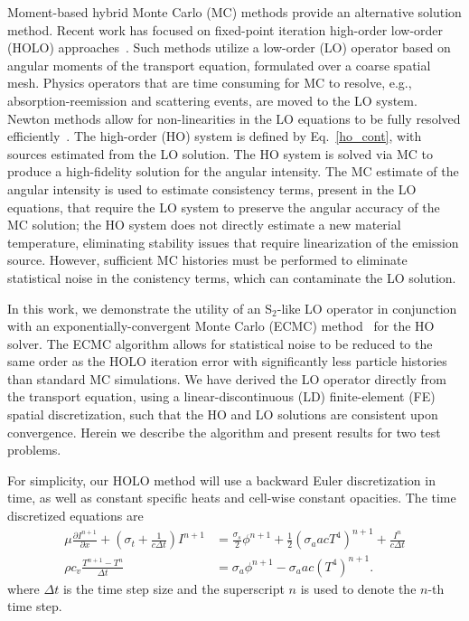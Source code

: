 \documentclass{mc2013}
\newcommand{\pderiv}[2]{\frac{\partial #1}{\partial #2}}
\begin{document}
Moment-based hybrid Monte Carlo (MC) methods provide an alternative solution
method.  Recent work has focused on fixed-point iteration high-order low-order (HOLO)
approaches~\cite{willert,park,rmc,ans_2014}.  Such methods utilize a low-order (LO)
operator based on angular moments of the transport equation, formulated over a coarse
spatial mesh. Physics operators that are time consuming for MC
to resolve, e.g., absorption-reemission and scattering events, are moved to the LO
system.  Newton methods allow for non-linearities in the LO equations to be fully
resolved efficiently~\cite{willert}.  The high-order (HO) system is defined by
Eq.~\eqref{ho_cont}, with sources estimated from the LO solution. The HO system is solved via MC to produce a high-fidelity solution for
the angular intensity.  The MC estimate of the angular intensity is used to estimate consistency terms,
present in the LO equations, that require the LO system to preserve the angular accuracy of the
MC solution; the HO system does not directly estimate a new material temperature,
eliminating stability issues that require linearization of the emission source.
However, sufficient MC histories must be performed to eliminate statistical
noise in the conistency terms, which can contaminate the LO solution.

In this work, we demonstrate the utility of an S$_2$-like LO operator in conjunction with an
exponentially-convergent Monte Carlo (ECMC) method~\cite{jake} for the HO solver.
The ECMC algorithm allows for statistical noise to be reduced to the same order as
the HOLO iteration error with significantly less particle histories than standard MC
simulations. We have derived the LO operator directly from the transport
equation, using a linear-discontinuous (LD) finite-element (FE) spatial
discretization, such that the HO and LO solutions are consistent upon convergence.
Herein we describe the algorithm and present results for two test problems.


For simplicity, our HOLO method will use a backward Euler discretization in time, as
well as constant specific heats and cell-wise constant opacities. The time discretized
equations are
\begin{align}
\mu \pderiv{I^{n+1}}{x} + \left(\sigma_t + \frac{1}{c \Delta t }\right) I^{n+1}
&= \frac{\sigma_s}{2} \phi^{n+1} +\frac{1}{2} \left(\sigma_a a c T^4 \right)^{n+1} +
\frac{I^n}{c \Delta t } \label{ho_trans} \\
\rho c_v \frac{T^{n+1} - T^n}{\Delta t} &= \sigma_a \phi^{n+1}
- \sigma_a a c (T^4)^{n+1} \label{lo_mat}.
\end{align}
where $\Delta t$ is the time step size and the superscript $n$ is used to denote
the $n$-th time step.  
\end{document}
